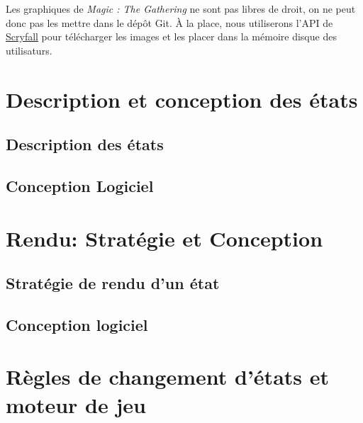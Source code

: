\documentclass[a4paper,12pt]{article}
\begin{document}
Les graphiques de \emph{Magic : The Gathering} ne sont pas libres de droit, on ne peut donc pas les mettre dans le dépôt Git.
À la place, nous utiliserons l'API de \href{https://scryfall.com/}{Scryfall} pour télécharger les images et les placer dans la mémoire disque des utilisaturs.

\clearpage
\section{Description et conception des états}

\subsection{Description des états}


\subsection{Conception Logiciel}



\clearpage
\section{Rendu: Stratégie et Conception}

\subsection{Stratégie de rendu d'un état}


\subsection{Conception logiciel}


\clearpage
\section{Règles de changement d'états et moteur de jeu}
\end{document}
